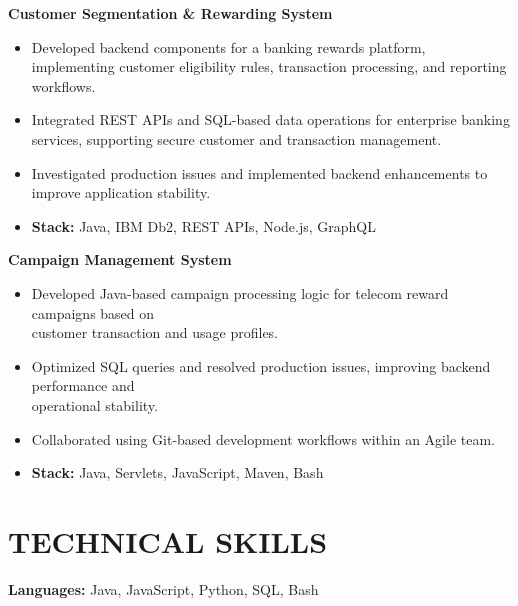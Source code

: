 \documentclass[12pt,a4paper]{article}
\begin{document}
\vspace{3pt}
\noindent\textbf{Customer Segmentation \& Rewarding System}
\begin{itemize}[leftmargin=*, itemsep=2pt, topsep=2pt]

\item Developed backend components for a banking rewards platform, implementing customer eligibility rules, transaction processing, and reporting workflows.

\item Integrated REST APIs and SQL-based data operations for enterprise banking services, supporting secure customer and transaction management.

\item Investigated production issues and implemented backend enhancements to improve application stability.

\item \textbf{Stack:} Java, IBM Db2, REST APIs, Node.js, GraphQL

\end{itemize}
\vspace{3pt}
\noindent\textbf{Campaign Management System}
\begin{itemize}[leftmargin=*, itemsep=2pt, topsep=2pt]

\item Developed Java-based campaign processing logic for telecom reward campaigns based on \\customer transaction and usage profiles.

\item Optimized SQL queries and resolved production issues, improving backend performance and \\operational stability.

\item Collaborated using Git-based development workflows within an Agile team.

\item \textbf{Stack:} Java, Servlets, JavaScript, Maven, Bash

\end{itemize}
\vspace{5pt}

\section*{TECHNICAL SKILLS}

\noindent\textbf{Languages:} Java, JavaScript, Python, SQL, Bash
\end{document}
